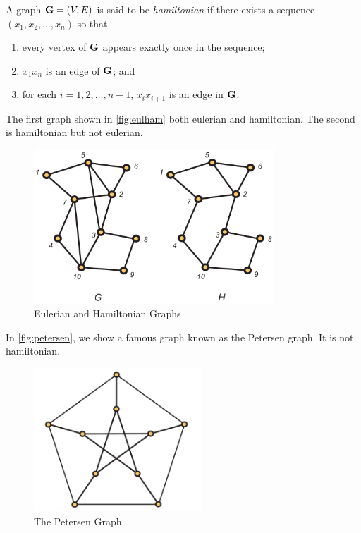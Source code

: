 A graph $\mathbf{G}=(V,E)$ is said to be \textit{hamiltonian} if there exists a
sequence $(x_1,x_2,\dots,x_n)$ so that
\begin{enumerate}
\item every vertex of $\mathbf{G}$ appears exactly once in the sequence;
\item $x_1x_n$ is an edge of $\mathbf{G}$; and
\item for each $i=1,2,\dots,n-1$, $x_ix_{i+1}$ is an edge in $\mathbf{G}$.
\end{enumerate}

The first graph shown in \autoref{fig:eulham} both eulerian and
hamiltonian.  The second is hamiltonian but not eulerian.
\begin{figure}
\begin{center}
\includegraphics*[width=3.55in]{graphs-figs/eulerian_hamiltonian_crop}
\caption{\label{fig:eulham}Eulerian and Hamiltonian Graphs}
\end{center}
\end{figure}

In \autoref{fig:petersen}, we show a famous graph known
as the Petersen graph. It is not hamiltonian.
\begin{figure}
\begin{center}
\includegraphics*[width=0.56\textwidth]{graphs-figs/petersen_graph}
\caption{\label{fig:petersen}The Petersen Graph}
\end{center}
\end{figure}


